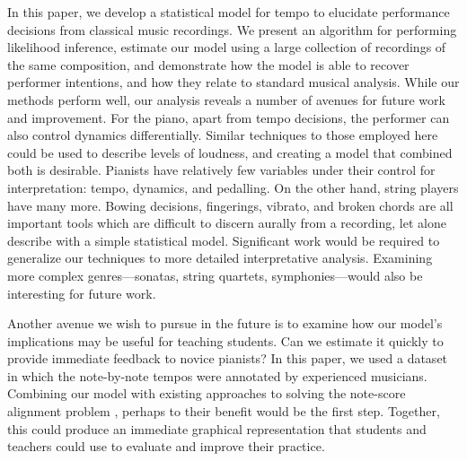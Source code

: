 \documentclass[aoas]{imsart}
\begin{document}
In this paper, we develop a statistical model for tempo to elucidate performance
decisions from classical music recordings. We present an algorithm for
performing likelihood inference, estimate our model using a large
collection of recordings of the same composition, and demonstrate how
the model is able to recover performer intentions, and how they relate
to standard musical analysis. While our methods perform well, our
analysis reveals a number of avenues for future work and
improvement. For the piano, apart from tempo decisions, the performer
can also control dynamics differentially. Similar techniques to those
employed here could be used to describe levels of loudness, and
creating a model that combined both is desirable. Pianists have
relatively few variables under their control for interpretation:
tempo, dynamics, and pedalling. On the other hand, string players have
many more. Bowing decisions, fingerings, vibrato, and broken chords are
all important tools which are difficult to discern aurally from a recording, let
alone describe with a simple statistical model. Significant work would
be required to generalize our techniques to more detailed
interpretative analysis. Examining more complex genres---sonatas, string quartets,
symphonies---would also be interesting for future work.

Another avenue we wish to pursue in the future is to examine how our
model's implications may be useful for teaching students. Can we
estimate it quickly to provide immediate feedback to novice pianists?
In this paper, we used a dataset in which the note-by-note tempos were
annotated by experienced musicians. Combining our model with existing
approaches to solving the note-score alignment problem
\citep{LangFreitas2005,Raphael2002,DannenbergRaphael2006}, perhaps to
their benefit would be the first step. Together, this could produce an
immediate graphical representation that students and teachers could
use to evaluate and improve their practice.


\begin{supplement}


  \label{supp}

\end{supplement}


\clearpage





\end{document}
